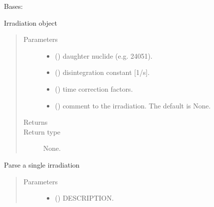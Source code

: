 \documentclass[letterpaper,10pt,english]{sphinxmanual}
\begin{document}
\begin{fulllineitems}
\label{\detokenize{api/inputgeneration:parsersD1S.Irradiation}}
Bases: 

Irradiation object
\begin{quote}\begin{description}
\item[{Parameters}] \leavevmode\begin{itemize}
\item {} 
 () \textendash{} daughter nuclide (e.g. 24051).

\item {} 
 () \textendash{} disintegration constant {[}1/s{]}.

\item {} 
 () \textendash{} time correction factors.

\item {} 
 (\sphinxstyleliteralemphasis{\sphinxupquote{, }}) \textendash{} comment to the irradiation. The default is None.

\end{itemize}

\item[{Returns}] \leavevmode


\item[{Return type}] \leavevmode
None.

\end{description}\end{quote}

\begin{fulllineitems}
\label{\detokenize{api/inputgeneration:parsersD1S.Irradiation.from_text}}
Parse a single irradiation
\begin{quote}\begin{description}
\item[{Parameters}] \leavevmode\begin{itemize}
\item {} 
 () \textendash{} DESCRIPTION.


\end{itemize}
\end{description}
\end{quote}
\end{fulllineitems}
\end{fulllineitems}
\end{document}
